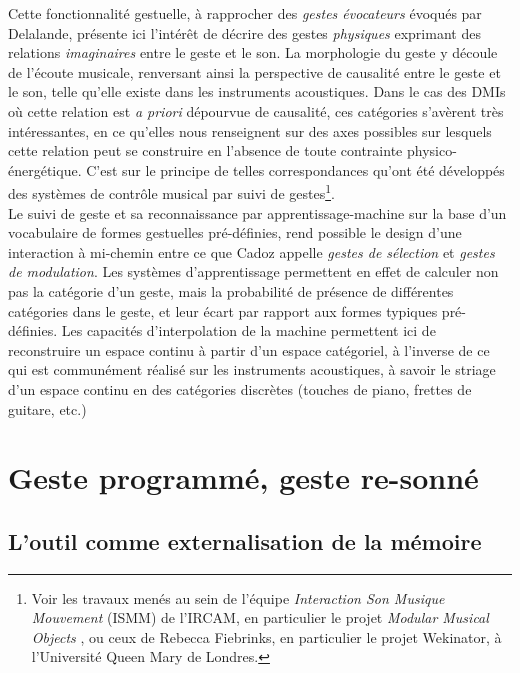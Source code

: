 \indent Cette fonctionnalité gestuelle, à rapprocher des \textit{gestes évocateurs} évoqués par Delalande, présente ici l'intérêt de décrire des gestes \textit{physiques} exprimant des relations \textit{imaginaires} entre le geste et le son. La morphologie du geste y découle de l'écoute musicale, renversant ainsi la perspective de causalité entre le geste et le son, telle qu'elle existe dans les instruments acoustiques. Dans le cas des \glspl{DMI} où cette relation est \textit{a priori} dépourvue de causalité, ces catégories s'avèrent très intéressantes, en ce qu'elles nous renseignent sur des axes possibles sur lesquels cette relation peut se construire en l'absence de toute contrainte physico-énergétique. C'est sur le principe de telles correspondances qu'ont été développés des systèmes de contrôle musical par suivi de gestes\footnote{Voir les travaux menés au sein de l'équipe \textit{Interaction Son Musique Mouvement} (ISMM) de l'\gls{IRCAM}, en particulier le projet \textit{Modular Musical Objects} \cite{caramiaux_mapping_2014, francoise_motion-sound_2015}, ou ceux de Rebecca Fiebrinks, en particulier le projet Wekinator, \cite{fiebrink_wekinator:_2010} à l'Université Queen Mary de Londres.}.\\
\indent Le suivi de geste et sa reconnaissance par apprentissage-machine sur la base d'un vocabulaire de formes gestuelles pré-définies, rend possible le design d'une interaction à mi-chemin entre ce que Cadoz appelle \textit{gestes de sélection} et \textit{gestes de modulation}. Les systèmes d'apprentissage permettent en effet de calculer non pas la catégorie d'un geste, mais la probabilité de présence de différentes catégories dans le geste, et leur écart par rapport aux formes typiques pré-définies. Les capacités d'interpolation de la machine permettent ici de reconstruire un espace continu à partir d'un espace catégoriel, à l'inverse de ce qui est communément réalisé sur les instruments acoustiques, à savoir le striage d'un espace continu en des catégories discrètes (touches de piano, frettes de guitare, etc.)




\section{Geste programmé, geste re-sonné}
\label{sec:gesture:instrumental_to_musical}
\subsection{L'outil comme externalisation de la mémoire}
\label{sec:gesture:instrumental_to_musical:externalisation}

